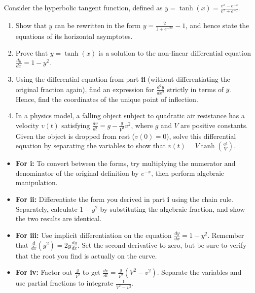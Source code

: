
\begin{problem}
Consider the hyperbolic tangent function, defined as $y = \tanh(x) = \frac{e^x - e^{-x}}{e^x + e^{-x}}$.

\begin{enumerate}
    \item[\textbf{i}] Show that $y$ can be rewritten in the form $y = \frac{2}{1+e^{-2x}} - 1$, and hence state the equations of its horizontal asymptotes.
    \item[\textbf{ii}] Prove that $y = \tanh(x)$ is a solution to the non-linear differential equation $\frac{dy}{dx} = 1 - y^2$.
    \item[\textbf{iii}] Using the differential equation from part \textbf{ii} (without differentiating the original fraction again), find an expression for $\frac{d^2y}{dx^2}$ strictly in terms of $y$. Hence, find the coordinates of the unique point of inflection.
    \item[\textbf{iv}] In a physics model, a falling object subject to quadratic air resistance has a velocity $v(t)$ satisfying $\frac{dv}{dt} = g - \frac{g}{V^2}v^2$, where $g$ and $V$ are positive constants. Given the object is dropped from rest ($v(0) = 0$), solve this differential equation by separating the variables to show that $v(t) = V \tanh\left(\frac{gt}{V}\right)$.
\end{enumerate}
\end{problem}

\begin{hint}
\begin{itemize}
    \item \textbf{For i:} To convert between the forms, try multiplying the numerator and denominator of the original definition by $e^{-x}$, then perform algebraic manipulation.
    \item \textbf{For ii:} Differentiate the form you derived in part \textbf{i} using the chain rule. Separately, calculate $1 - y^2$ by substituting the algebraic fraction, and show the two results are identical. 
    \item \textbf{For iii:} Use implicit differentiation on the equation $\frac{dy}{dx} = 1 - y^2$. Remember that $\frac{d}{dx}(y^2) = 2y \frac{dy}{dx}$. Set the second derivative to zero, but be sure to verify that the root you find is actually on the curve.
    \item \textbf{For iv:} Factor out $\frac{g}{V^2}$ to get $\frac{dv}{dt} = \frac{g}{V^2}(V^2 - v^2)$. Separate the variables and use partial fractions to integrate $\frac{1}{V^2 - v^2}$.
\end{itemize}
\end{hint}

